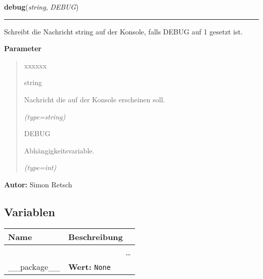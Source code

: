 \hspace{.8\funcindent}\begin{boxedminipage}{\funcwidth}

    \raggedright \textbf{debug}(\textit{string}, \textit{DEBUG})

    \vspace{-1.5ex}

    \rule{\textwidth}{0.5\fboxrule}
\setlength{\parskip}{2ex}
    Schreibt die Nachricht string auf der Konsole, falls DEBUG auf 1 
    gesetzt ist.

\setlength{\parskip}{1ex}
      \textbf{Parameter}
      \vspace{-1ex}

      \begin{quote}
        \begin{Ventry}{xxxxxx}

          \item[string]

          Nachricht die auf der Konsole erscheinen soll.

            {\it (type=string)}

          \item[DEBUG]

          Abhängigkeitsvariable.

            {\it (type=int)}

        \end{Ventry}

      \end{quote}

\textbf{Autor:} Simon Retsch



    \end{boxedminipage}



  \subsection{Variablen}

    \vspace{-1cm}
\hspace{\varindent}\begin{longtable}{|p{\varnamewidth}|p{\vardescrwidth}|l}
\cline{1-2}
\cline{1-2} \centering \textbf{Name} & \centering \textbf{Beschreibung}& \\
\cline{1-2}
\endhead\cline{1-2}\multicolumn{3}{r}{\small\ldots}\\\endfoot\cline{1-2}
\endlastfoot\raggedright \_\-\_\-p\-a\-c\-k\-a\-g\-e\-\_\-\_\- & \raggedright \textbf{Wert:} 
{\tt None}&\\
\cline{1-2}
\end{longtable}

